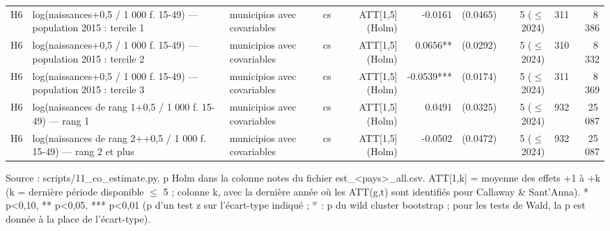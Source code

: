 \begin{table}
\begin{threeparttable}
\begin{tabular}{lp{6.7cm}p{5.2cm}lrrrrrr}
H6 & log(naissances+0,5 / 1 000 f. 15-49) — population 2015 : tercile 1 & municipios avec covariables & cs & ATT[1,5] (Holm) & -0.0161 & (0.0465) & 5 ($\leq$ 2024) & 311 & 8\,386 \\
H6 & log(naissances+0,5 / 1 000 f. 15-49) — population 2015 : tercile 2 & municipios avec covariables & cs & ATT[1,5] (Holm) & 0.0656** & (0.0292) & 5 ($\leq$ 2024) & 310 & 8\,332 \\
H6 & log(naissances+0,5 / 1 000 f. 15-49) — population 2015 : tercile 3 & municipios avec covariables & cs & ATT[1,5] (Holm) & -0.0539*** & (0.0174) & 5 ($\leq$ 2024) & 311 & 8\,369 \\
H6 & log(naissances de rang 1+0,5 / 1 000 f. 15-49) — rang 1 & municipios avec covariables & cs & ATT[1,5] (Holm) & 0.0491 & (0.0325) & 5 ($\leq$ 2024) & 932 & 25\,087 \\
H6 & log(naissances de rang 2++0,5 / 1 000 f. 15-49) — rang 2 et plus & municipios avec covariables & cs & ATT[1,5] (Holm) & -0.0502 & (0.0472) & 5 ($\leq$ 2024) & 932 & 25\,087 \\
\bottomrule
\end{tabular}
\begin{tablenotes}\footnotesize
\item Source : scripts/11\_co\_estimate.py. p Holm dans la colonne notes du fichier est\_<pays>\_all.csv. ATT[1,k] = moyenne des effets +1 à +k (k = dernière période disponible $\leq$ 5 ; colonne k, avec la dernière année où les ATT(g,t) sont identifiés pour Callaway \& Sant'Anna). * p<0,10, ** p<0,05, *** p<0,01 (p d'un test z sur l'écart-type indiqué ; $^{w}$ : p du wild cluster bootstrap ; pour les tests de Wald, la p est donnée à la place de l'écart-type).
\end{tablenotes}
\end{threeparttable}
\end{table}
